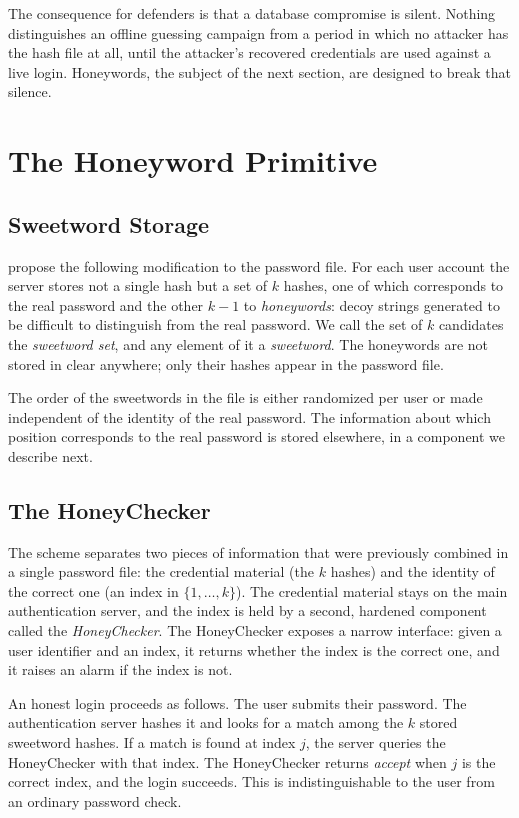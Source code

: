 The consequence for defenders is that a database compromise is silent.
Nothing distinguishes an offline guessing campaign from a period in
which no attacker has the hash file at all, until the attacker's
recovered credentials are used against a live login. Honeywords, the
subject of the next section, are designed to break that silence.

\section{The Honeyword Primitive}
\label{sec:bg-honeywords}

\subsection{Sweetword Storage}

\textcite{juels2013honeywords} propose the following modification to
the password file. For each user account the server stores not a
single hash but a set of $k$ hashes, one of which corresponds to the
real password and the other $k-1$ to \emph{honeywords}: decoy strings
generated to be difficult to distinguish from the real password. We
call the set of $k$ candidates the \emph{sweetword set}, and any
element of it a \emph{sweetword}. The honeywords are not stored in
clear anywhere; only their hashes appear in the password file.

The order of the sweetwords in the file is either randomized per user
or made independent of the identity of the real password. The
information about which position corresponds to the real password is
stored elsewhere, in a component we describe next.

\subsection{The HoneyChecker}

The scheme separates two pieces of information that were previously
combined in a single password file: the credential material (the $k$
hashes) and the identity of the correct one (an index in
$\{1, \ldots, k\}$). The credential material stays on the main
authentication server, and the index is held by a second, hardened
component called the \emph{HoneyChecker}. The HoneyChecker exposes a
narrow interface: given a user identifier and an index, it returns
whether the index is the correct one, and it raises an alarm if the
index is not.

An honest login proceeds as follows. The user submits their password.
The authentication server hashes it and looks for a match among the
$k$ stored sweetword hashes. If a match is found at index $j$, the
server queries the HoneyChecker with that index. The HoneyChecker
returns \emph{accept} when $j$ is the correct index, and the login
succeeds. This is indistinguishable to the user from an ordinary
password check.

